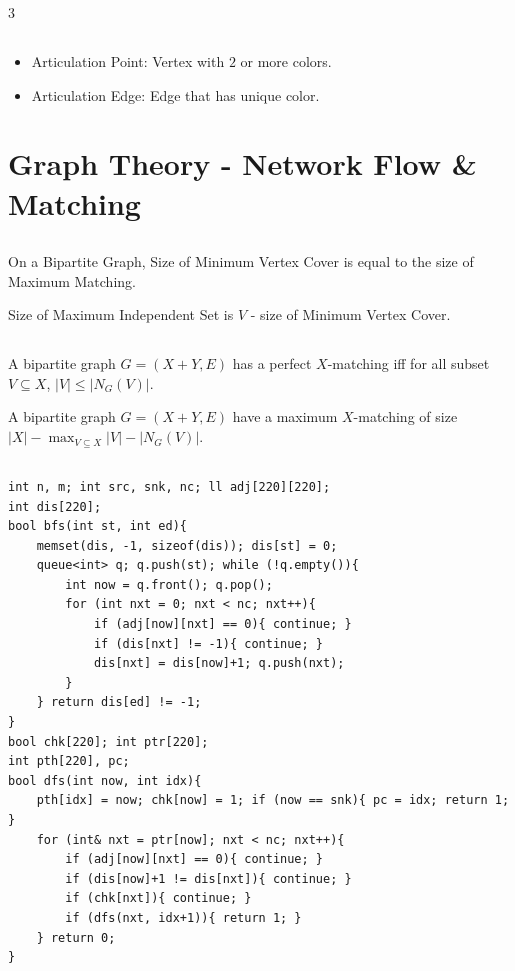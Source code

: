 \documentclass[landscape, 8pt, a4paper, oneside]{extarticle}
\begin{document}
\begin{multicols*}{3}
\subsection{}
\begin{itemize}
	\item Articulation Point: Vertex with $2$ or more colors.
	\item Articulation Edge: Edge that has unique color.
\end{itemize}
\section{Graph Theory - Network Flow \& Matching}
\subsection{}
On a Bipartite Graph, Size of Minimum Vertex Cover is equal to the size of Maximum Matching.

Size of Maximum Independent Set is $V$ - size of Minimum Vertex Cover.
\subsection{}
A bipartite graph $G = (X+Y, E)$ has a perfect $X$-matching iff for all subset $V \subseteq X$, $|V| \le |N_G(V)|$.

A bipartite graph $G = (X+Y, E)$ have a maximum $X$-matching of size $|X| - \max_{V \subseteq X} |V| - |N_G(V)|$.
\subsection{}
\begin{verbatim}
int n, m; int src, snk, nc; ll adj[220][220];
int dis[220];
bool bfs(int st, int ed){
	memset(dis, -1, sizeof(dis)); dis[st] = 0;
	queue<int> q; q.push(st); while (!q.empty()){
		int now = q.front(); q.pop();
		for (int nxt = 0; nxt < nc; nxt++){
			if (adj[now][nxt] == 0){ continue; }
			if (dis[nxt] != -1){ continue; }
			dis[nxt] = dis[now]+1; q.push(nxt);
		}
	} return dis[ed] != -1;
}
bool chk[220]; int ptr[220];
int pth[220], pc;
bool dfs(int now, int idx){
	pth[idx] = now; chk[now] = 1; if (now == snk){ pc = idx; return 1; }
	for (int& nxt = ptr[now]; nxt < nc; nxt++){
		if (adj[now][nxt] == 0){ continue; }
		if (dis[now]+1 != dis[nxt]){ continue; }
		if (chk[nxt]){ continue; }
		if (dfs(nxt, idx+1)){ return 1; }
	} return 0;
}


\end{verbatim}
\end{multicols*}
\end{document}
